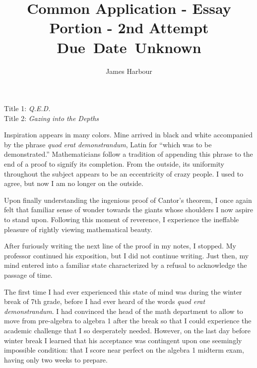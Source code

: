 \documentclass[12pt]{article}
\title{
    \vspace{2in}
    \textmd{\textbf{Common Application - Essay Portion - 2nd Attempt}}\\
    \normalsize\vspace{0.1in}\small{Due\ Date\ Unknown}\\
    \vspace{3in}
}
\author{James Harbour}
\begin{document}
\maketitle
\pagebreak
 \begin{center}

   Title 1: \emph{Q.E.D.} \\
   Title 2: \emph{Gazing into the Depths}

 \end{center}
\raggedright\setlength{\parindent}{0.5in}



Inspiration appears in many colors. Mine arrived in black and white accompanied by the phrase \emph{quod erat demonstrandum}, Latin for ``which was to be demonstrated.'' Mathematicians follow a tradition of appending this phrase to the end of a proof to signify its completion. From the outside, its uniformity throughout the subject appears to be an eccentricity of crazy people. I used to agree, but now I am no longer on the outside. %


Upon finally understanding the ingenious proof of Cantor’s theorem, I once again felt that familiar sense of wonder towards the giants whose shoulders I now aspire to stand upon. Following this moment of reverence, I experience the ineffable pleasure of rightly viewing mathematical beauty.


After furiously writing the next line of the proof in my notes, I stopped. My professor continued his exposition, but I did not continue writing. Just then, my mind entered into a familiar state characterized by a refusal to acknowledge the passage of time.


  The first time I had ever experienced this state of mind was during the winter break of 7th grade, before I had ever heard of the words \emph{quod erat demonstrandum}. I had convinced the head of the math department to allow to move from pre-algebra to algebra 1 after the break so that I could experience the academic challenge that I so desperately needed. However, on the last day before winter break I learned that his acceptance was contingent upon one seemingly impossible condition: that I score near perfect on the algebra 1 midterm exam, having only two weeks to prepare.
\end{document}
